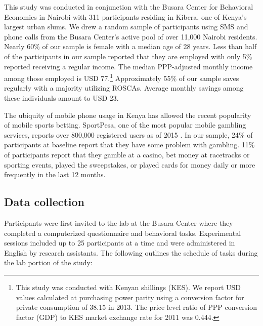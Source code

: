 \documentclass[11pt]{article}
\begin{document}
		This study was conducted in conjunction with the Busara Center for Behavioral Economics in Nairobi with 311 participants residing in Kibera, one of Kenya's largest urban slums. We drew a random sample of participants using SMS and phone calls from the Busara Center's active pool of over 11,000 Nairobi residents. Nearly 60\% of our sample is female with a median age of 28 years. Less than half of the participants in our sample reported that they are employed with only 5\% reported receiving a regular income. The median PPP-adjusted monthly income among those employed is USD 77.\footnote{This study was conducted with Kenyan shillings (KES). We report USD values calculated at purchasing power parity using a conversion factor for private consumption of 38.15 in 2013. The price level ratio of PPP conversion factor (GDP) to KES market exchange rate for 2011 was 0.444.} Approximately 55\% of our sample saves regularly with a majority utilizing ROSCAs. Average monthly savings among these individuals amount to USD 23. %

		The ubiquity of mobile phone usage in Kenya has allowed the recent popularity of mobile sports betting. SportPesa, one of the most popular mobile gambling services, reports over 800,000 registered users as of 2015 . In our sample, 24\% of participants at baseline report that they have some problem with gambling. 11\% of participants report that they gamble at a casino, bet money at racetracks or sporting events, played the sweepstakes, or played cards for money daily or more frequently in the last 12 months.


	\subsection{Data collection}

		Participants were first invited to the lab at the Busara Center where they completed a computerized questionnaire and behavioral tasks. Experimental sessions included up to 25 participants at a time and were administered in English by research assistants. The following outlines the schedule of tasks during the lab portion of the study:
\end{document}
